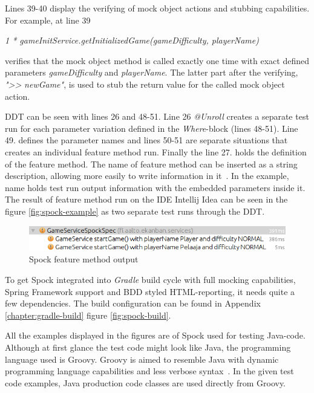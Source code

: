     Lines 39-40 display the verifying of mock object actions and stubbing capabilities.
    For example, at line 39
    \begin{center}
    \textit{1 * gameInitService.getInitializedGame(gameDifficulty, playerName)}
    \end{center}
    verifies that the mock object method is called exactly one time with exact defined parameters \textit{gameDifficulty} and \textit{playerName}.
    The latter part after the verifying, \textit{"\textgreater\textgreater} \textit{newGame"}, is used to stub the return value for the
    called mock object action.

    DDT can be seen with lines 26 and 48-51.
    Line 26 \textit{@Unroll} creates a separate test run for each parameter
    variation defined in the \textit{Where}-block (lines 48-51). Line 49. defines the parameter names and lines 50-51 are
    separate situations that creates an individual feature method run. Finally the line 27. holds the definition of
    the feature method. The name of feature method can be inserted as a string description, allowing more easily to write
    information in it~\cite{kapelonis2016java}. In the example, name holds test run output information with the embedded parameters inside it.
    The result of feature method run on the IDE Intellij Idea can be seen in the figure \ref{fig:spock-example} as two separate test runs through the DDT.
    \begin{figure}[ht]
      \begin{center}
        \includegraphics[width=12.5cm]{images/spock-result.png}
        \caption{Spock feature method output}
        \label{fig:spock-result}
      \end{center}
    \end{figure}

    To get Spock integrated into \textit{Gradle} build cycle with full mocking capabilities, Spring Framework support and BDD styled HTML-reporting, it needs
    quite a few dependencies. The build configuration can be found in Appendix \ref{chapter:gradle-build} figure \ref{fig:spock-build}.

    All the examples displayed in the figures are of Spock used for testing Java-code. Although at first glance the test code might
    look like Java, the programming language used is Groovy. Groovy is aimed to resemble Java with dynamic programming language
    capabilities and less verbose syntax~\cite{kapelonis2016java}. In the given test code examples, Java production code classes are used directly
    from Groovy.


